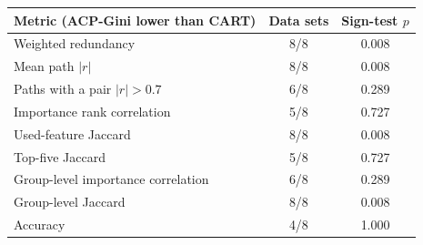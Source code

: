 \begin{tabular}{lcc}
\toprule
Metric (ACP-Gini lower than CART) & Data sets & Sign-test $p$ \\
\midrule
Weighted redundancy & 8/8 & 0.008 \\
Mean path $|r|$ & 8/8 & 0.008 \\
Paths with a pair $|r|>0.7$ & 6/8 & 0.289 \\
Importance rank correlation & 5/8 & 0.727 \\
Used-feature Jaccard & 8/8 & 0.008 \\
Top-five Jaccard & 5/8 & 0.727 \\
Group-level importance correlation & 6/8 & 0.289 \\
Group-level Jaccard & 8/8 & 0.008 \\
Accuracy & 4/8 & 1.000 \\
\bottomrule
\end{tabular}
